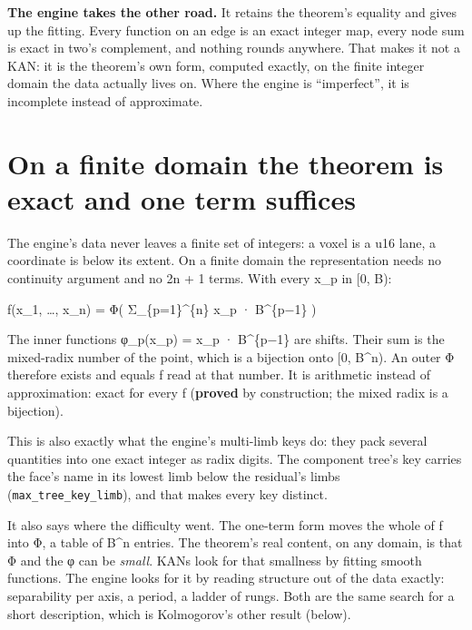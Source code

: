 \textbf{The engine takes the other road.} It retains the theorem's equality and gives up the fitting. Every function on an edge is an exact integer map, every node sum is exact in two's complement, and nothing rounds anywhere. That makes it not a KAN: it is the theorem's own form, computed exactly, on the finite integer domain the data actually lives on. Where the engine is “imperfect”, it is incomplete instead of approximate.

\section{\texorpdfstring{On a finite domain the theorem is exact and one term suffices}{On a finite domain the theorem is exact and one term suffices}}

The engine's data never leaves a finite set of integers: a voxel is a u16 lane, a coordinate is below its extent. On a finite domain the representation needs no continuity argument and no 2n + 1 terms. With every x\_\allowbreak{}p in [0, B):

f(x\_\allowbreak{}1, …, x\_\allowbreak{}n) = Φ( Σ\_\allowbreak{}\{p=1\}\textasciicircum{}\{n\} x\_\allowbreak{}p · B\textasciicircum{}\{p−1\} )

The inner functions φ\_\allowbreak{}p(x\_\allowbreak{}p) = x\_\allowbreak{}p · B\textasciicircum{}\{p−1\} are shifts. Their sum is the mixed-radix number of the point, which is a bijection onto [0, B\textasciicircum{}n). An outer Φ therefore exists and equals f read at that number. It is arithmetic instead of approximation: exact for every f (\textbf{proved} by construction; the mixed radix is a bijection).

This is also exactly what the engine's multi-limb keys do: they pack several quantities into one exact integer as radix digits. The component tree's key carries the face's name in its lowest limb below the residual's limbs (\texttt{max\_\allowbreak{}tree\_\allowbreak{}key\_\allowbreak{}limb}), and that makes every key distinct.

It also says where the difficulty went. The one-term form moves the whole of f into Φ, a table of B\textasciicircum{}n entries. The theorem's real content, on any domain, is that Φ and the φ can be \emph{small}. KANs look for that smallness by fitting smooth functions. The engine looks for it by reading structure out of the data exactly: separability per axis, a period, a ladder of rungs. Both are the same search for a short description, which is Kolmogorov's other result (below).

